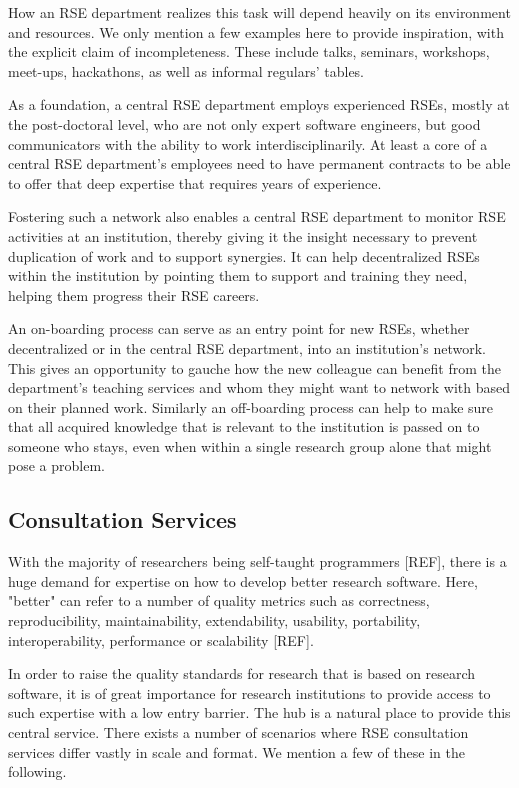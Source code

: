 \documentclass{article}
\begin{document}
How an RSE department realizes this task will depend heavily on its environment and resources. We only mention a few examples here to provide inspiration, with the explicit claim of incompleteness.
These include talks, seminars, workshops, meet-ups, hackathons, as well as informal regulars' tables.

As a foundation, a central RSE department employs experienced RSEs, mostly at the post-doctoral level, who are not only expert software engineers, but good communicators with the ability to work interdisciplinarily.
At least a core of a central RSE department's employees need to have permanent contracts to be able to offer that deep expertise that requires years of experience.

Fostering such a network also enables a central RSE department to monitor RSE activities at an institution, thereby giving it the insight necessary to prevent duplication of work and to support synergies.
It can help decentralized RSEs within the institution by pointing them to support and training they need, helping them progress their RSE careers.

An on-boarding process can serve as an entry point for new RSEs, whether decentralized or in the central RSE department, into an institution's network.
This gives an opportunity to gauche how the new colleague can benefit from the department's teaching services and whom they might want to network with based on their planned work.
Similarly an off-boarding process can help to make sure that all acquired knowledge that is relevant to the institution is passed on to someone who stays, even when within a single research group alone that might pose a problem.

\subsection{Consultation Services}

With the majority of researchers being self-taught programmers [REF], there is a huge demand for expertise on how to develop better research software.
Here, "better" can refer to a number of quality metrics such as correctness, reproducibility, maintainability, extendability, usability, portability, interoperability, performance or scalability [REF].

In order to raise the quality standards for research that is based on research software, it is of great importance for research institutions to provide access to such expertise with a low entry barrier.
The hub is a natural place to provide this central service.
There exists a number of scenarios where RSE consultation services differ vastly in scale and format.
We mention a few of these in the following.
\end{document}
